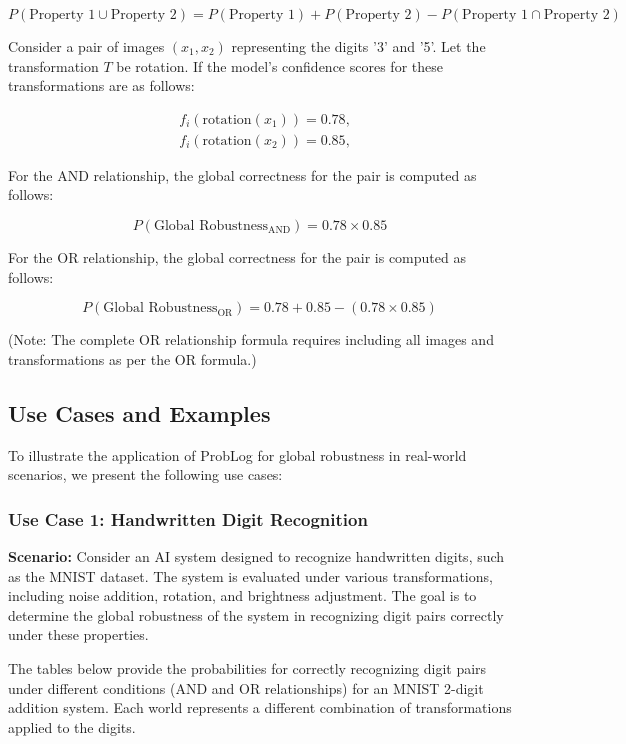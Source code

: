 $$ P(\text{Property 1} \cup \text{Property 2}) = P(\text{Property 1}) + P(\text{Property 2}) - P(\text{Property 1} \cap \text{Property 2}) $$

\begin{example}
Consider a pair of images $(x_1, x_2)$ representing the digits '3' and '5'. Let the transformation $T$ be rotation. If the model's confidence scores for these transformations are as follows:

$$
\begin{aligned}
&f_i(\text{rotation}(x_1)) = 0.78, \\
&f_i(\text{rotation}(x_2)) = 0.85,
\end{aligned}
$$

For the AND relationship, the global correctness for the pair is computed as follows:

$$P(\text{Global Robustness}_{\text{AND}}) = 0.78 \times 0.85$$

For the OR relationship, the global correctness for the pair is computed as follows:

$$P(\text{Global Robustness}_{\text{OR}}) = 0.78 + 0.85 - (0.78 \times 0.85)$$

(Note: The complete OR relationship formula requires including all images and transformations as per the OR formula.)

\end{example}

\subsection{Use Cases and Examples}
To illustrate the application of ProbLog for global robustness in real-world scenarios, we present the following use cases:

\subsubsection{Use Case 1: Handwritten Digit Recognition}
\textbf{Scenario:} Consider an AI system designed to recognize handwritten digits, such as the MNIST dataset. The system is evaluated under various transformations, including noise addition, rotation, and brightness adjustment. The goal is to determine the global robustness of the system in recognizing digit pairs correctly under these properties.

The tables below provide the probabilities for correctly recognizing digit pairs under different conditions (AND and OR relationships) for an MNIST 2-digit addition system. Each world represents a different combination of transformations applied to the digits.

